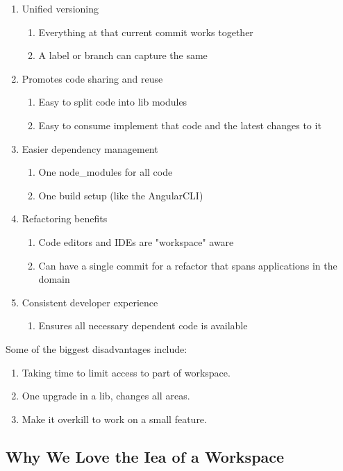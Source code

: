 \begin{enumerate}
  \item Unified versioning
    \begin{enumerate}
      \item Everything at that current commit works together
      \item A label or branch can capture the same
    \end{enumerate}
  \item Promotes code sharing and reuse
    \begin{enumerate}
      \item Easy to split code into lib modules
      \item Easy to consume implement that code and the latest changes to it
    \end{enumerate}
  \item Easier dependency management
    \begin{enumerate}
      \item One node\_modules for all code
      \item One build setup (like the AngularCLI)
    \end{enumerate}
  \item Refactoring benefits
    \begin{enumerate}
      \item Code editors and IDEs are "workspace" aware
      \item Can have a single commit for a refactor that spans applications in the domain
    \end{enumerate}
  \item Consistent developer experience
    \begin{enumerate}
      \item Ensures all necessary dependent code is available
    \end{enumerate}
\end{enumerate}

Some of the biggest disadvantages include:
\begin{enumerate}
  \item Taking time to limit access to part of workspace.
  \item One upgrade in a lib, changes all areas.
  \item Make it overkill to work on a small feature.
\end{enumerate}

\subsection{Why We Love the Iea of a Workspace}

